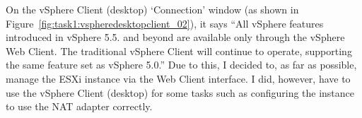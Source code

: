 \noindent On the vSphere Client (desktop) `Connection' window (as shown in Figure~\ref{fig:task1:vspheredesktopclient_02}), it says ``All vSphere features introduced in vSphere 5.5. and beyond are available only through the vSphere Web Client. The traditional vSphere Client will continue to operate, supporting the same feature set as vSphere 5.0.'' Due to this, I decided to, as far as possible, manage the ESXi instance via the Web Client interface. I did, however, have to use the vSphere Client (desktop) for some tasks such as configuring the instance to use the NAT adapter correctly.
